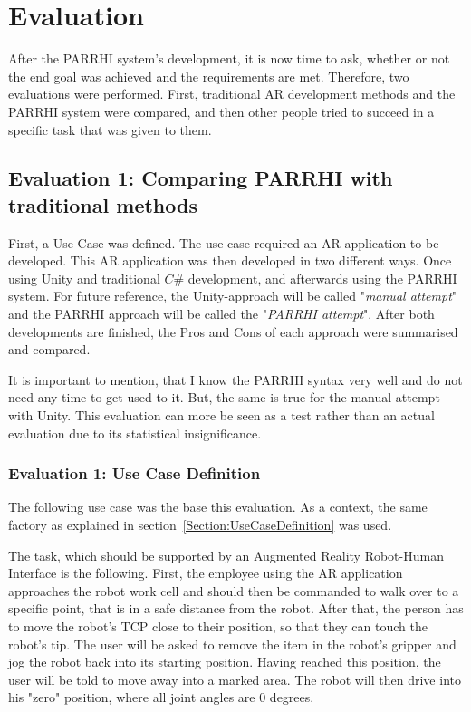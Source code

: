 \chapter{Evaluation}\label{Chap:Evaluation}

After the PARRHI system's development, it is now time to ask, whether or not the end goal was achieved and the requirements are met. Therefore, two evaluations were performed. First, traditional AR development methods and the PARRHI system were compared, and then other people tried to succeed in a specific task that was given to them. 

\section{Evaluation 1: Comparing PARRHI with traditional methods}

First, a Use-Case was defined. The use case required an AR application to be developed. This AR application was then developed in two different ways. Once using Unity and traditional $C\#$ development, and afterwards using the PARRHI system. For future reference, the Unity-approach will be called "\textit{manual attempt}" and the PARRHI approach will be called the "\textit{PARRHI attempt}". After both developments are finished, the Pros and Cons of each approach were summarised and compared.

It is important to mention, that I know the PARRHI syntax very well and do not need any time to get used to it. But, the same is true for the manual attempt with Unity. This evaluation can more be seen as a test rather than an actual evaluation due to its statistical insignificance.

\subsection{Evaluation 1: Use Case Definition}
The following use case was the base this evaluation. As a context, the same factory as explained in section~\ref{Section:UseCaseDefinition} was used. 

The task, which should be supported by an Augmented Reality Robot-Human Interface is the following. First, the employee using the AR application approaches the robot work cell and should then be commanded to walk over to a specific point, that is in a safe distance from the robot. After that, the person has to move the robot's TCP close to their position, so that they can touch the robot's tip. The user will be asked to remove the item in the robot's gripper and jog the robot back into its starting position. Having reached this position, the user will be told to move away into a marked area. The robot will then drive into his "zero" position, where all joint angles are 0 degrees. 

